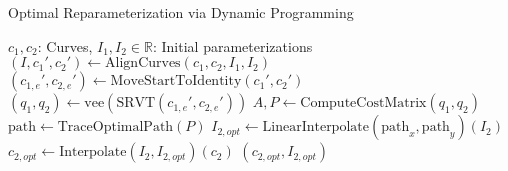 \begin{algorithm}
\caption{Optimal Reparameterization via Dynamic Programming}
\begin{algorithmic}[1]
\Require $c_1, c_2$: Curves, $I_1, I_2 \in \mathbb{R}$: Initial parameterizations
    \State $(I, c_1', c_2') \gets \text{AlignCurves}(c_1, c_2, I_1, I_2)$
    \State $(c_{1,e}', c_{2,e}') \gets \text{MoveStartToIdentity}(c_1', c_2')$ \Comment{\eqref{eq:maurer-cartan-gl}}
    \State $(q_1, q_2) \gets \text{vee}(\text{SRVT}(c_{1,e}', c_{2,e}'))$ \Comment{\eqref{eq:srvt-discrete}, \eqref{eq:vee_SO3}, \eqref{eq:vee_SE3}}
    \State $A, P \gets \text{ComputeCostMatrix}(q_1, q_2)$  \Comment{\eqref{eq:cost-matrix}}
    \State $\text{path} \gets \text{TraceOptimalPath}(P)$ 
    \State $I_{2, opt} \gets \text{LinearInterpolate}(\text{path}_x, \text{path}_y)(I_2)$ 
    \State $c_{2, opt} \gets \text{Interpolate}(I_{2}, I_{2, opt})(c_2)$  \Comment{\eqref{eq:interpolation-discrete}}
    \State \Return $(c_{2, opt}, I_{2, opt})$
\EndFunction
\end{algorithmic}
\end{algorithm}